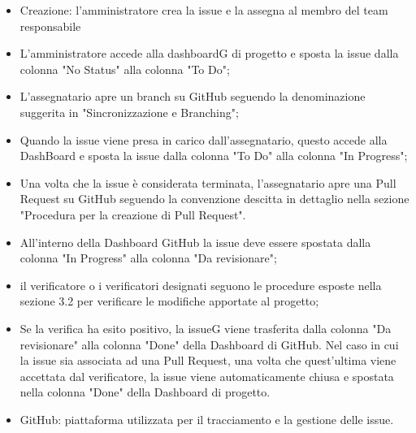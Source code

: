 \begin{itemize}
    \item Creazione: l’amministratore crea la issue e la assegna al membro del team responsabile
    \item L’amministratore accede alla dashboardG di progetto e sposta la issue dalla colonna "No Status" alla colonna "To Do";    
    \item L’assegnatario apre un branch su GitHub seguendo la denominazione suggerita in "Sincronizzazione e Branching";
    \item Quando la issue viene presa in carico dall’assegnatario, questo accede alla DashBoard e sposta la issue dalla colonna "To Do" alla colonna "In Progress";
    \item Una volta che la issue è considerata terminata, l’assegnatario apre una Pull Request su GitHub seguendo la convenzione descitta in dettaglio nella sezione "Procedura per la creazione di Pull Request".
    \item All’interno della Dashboard GitHub la issue deve essere spostata dalla colonna "In Progress" alla colonna "Da revisionare";
    \item il verificatore o i verificatori designati seguono le procedure esposte nella sezione 3.2 per verificare le modifiche apportate al progetto;
    \item Se la verifica ha esito positivo, la issueG viene trasferita dalla colonna "Da revisionare" alla colonna "Done" della Dashboard di GitHub. Nel caso in cui la issue sia associata ad una Pull Request, una volta che quest’ultima viene accettata dal verificatore, la issue viene automaticamente chiusa e spostata nella colonna "Done" della Dashboard di progetto.
\end{itemize}
\begin{itemize}
    \item GitHub: piattaforma utilizzata per il tracciamento e la gestione delle issue.
\end{itemize}
